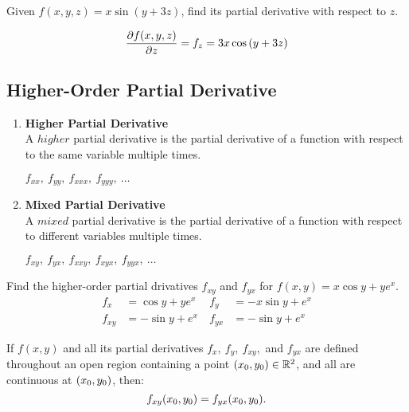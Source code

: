 \begin{example}
    \normalfont Given $f(x, y, z) = x \sin{(y + 3z)}$, find its partial derivative with respect to $z$.

    $$\frac{\partial f(x, y, z)}{\partial z} = f_z = 3x \cos{(y + 3z)}$$
\end{example}


\subsection{Higher-Order Partial Derivative}

\begin{enumerate}
     \item \textbf{Higher Partial Derivative} \\
    A $higher$ partial derivative is the partial derivative of a function with respect to the same variable multiple times.
    \begin{example}
        \normalfont $f_{xx},\ f_{yy},\ f_{xxx},\ f_{yyy},\ \hdots$
    \end{example}

    \item \textbf{Mixed Partial Derivative} \\
    A $mixed$ partial derivative is the partial derivative of a function with respect to different variables multiple times.
    \begin{example}
        \normalfont $f_{xy},\ f_{yx},\ f_{xxy},\ f_{xyx},\ f_{yyx},\ \hdots$
    \end{example}
\end{enumerate}

\begin{example}
    \normalfont Find the higher-order partial drivatives $f_{xy}$ and $f_{yx}$ for $f(x, y) = x\cos{y} + ye^x$.
    \begin{align*}
        f_x &= \cos{y} + ye^x &\ f_y &= -x\sin{y} + e^x \\
        f_{xy} &= -\sin{y} + e^x &\ f_{yx} &= -\sin{y} + e^x
    \end{align*}
\end{example}

\begin{theorem}
    If $f(x, y)$ and all its partial derivatives $f_x,\ f_y,\ f_{xy},$ and $f_{yx}$ are defined throughout an open region
    containing a point $(x_0, y_0) \in \mathbb{R}^2$, and all are continuous at $(x_0, y_0)$, then:
    \begin{equation}
        f_{xy}(x_0, y_0) = f_{yx}(x_0, y_0).
    \end{equation}
\end{theorem}

